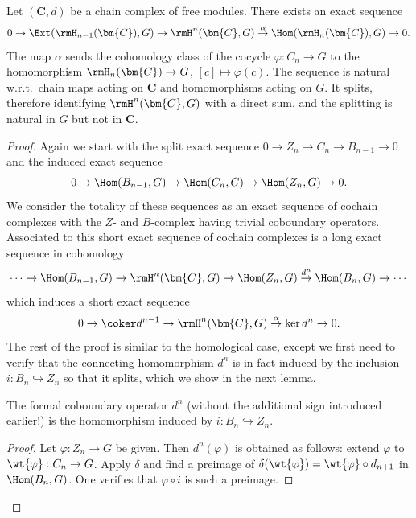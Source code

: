 \begin{prop}\label{prop 11.9.2 tomDieck}
    Let $(\bm{C},d)$ be a chain complex of free modules. There exists an exact sequence
    \[0\to \Ext(\rmH_{n-1}(\bm{C}),G)\to \rmH^n(\bm{C},G)\overset{\alpha}{\to}\Hom(\rmH_n(\bm{C}),G)\to 0.\]
    The map $\alpha$ sends the cohomology class of the cocycle $\varphi:C_n\to G$ to the homomorphism $\rmH_n(\bm{C})\to G$, $[c]\mapsto \varphi(c)$. The sequence is natural w.r.t.\ chain maps acting on $\bm{C}$ and homomorphisms acting on $G$. It splits, therefore identifying $\rmH^n(\bm{C},G)$ with a direct sum, and the splitting is natural in $G$ but not in $\bm{C}$. 
\end{prop}
\begin{proof}
    Again we start with the split exact sequence $0\to Z_n\to C_n\to B_{n-1}\to 0$ and the induced exact sequence
    \[0\to \Hom(B_{n-1},G)\to \Hom(C_n,G)\to \Hom(Z_n,G)\to 0.\]
    We consider the totality of these sequences as an exact sequence of cochain complexes with the $Z$- and $B$-complex having trivial coboundary operators. Associated to this short exact sequence of cochain complexes is a long exact sequence in cohomology
    \[\cdots\to \Hom(B_{n-1},G)\to \rmH^n(\bm{C},G)\to \Hom(Z_n,G)\overset{d^n}{\to}\Hom(B_n,G)\to \cdots\]
    which induces a short exact sequence
    \[0\to \coker d^{n-1}\to \rmH^n(\bm{C},G)\overset{\alpha}{\to }\ker d^n\to 0.\]
    The rest of the proof is similar to the homological case, except we first need to verify that the connecting homomorphism $d^n$ is in fact induced by the inclusion $i:B_n\hookrightarrow Z_n$ so that it splits, which we show in the next lemma.

    \begin{lem}\label{lem 11.9.3 tomDieck}
        The formal coboundary operator $d^n$ (without the additional sign introduced earlier!) is the homomorphism induced by $i:B_n\hookrightarrow Z_n$.
    \end{lem}
    \begin{proof}
        Let $\varphi:Z_n\to G$ be given. Then $d^n(\varphi)$ is obtained as follows: extend $\varphi$ to $\wt{\varphi}:C_n\to G$. Apply $\delta$ and find a preimage of $\delta(\wt{\varphi})=\wt{\varphi}\circ d_{n+1}$ in $\Hom(B_n,G)$. One verifies that $\varphi\circ i$ is such a preimage.
    \end{proof}


\end{proof}
